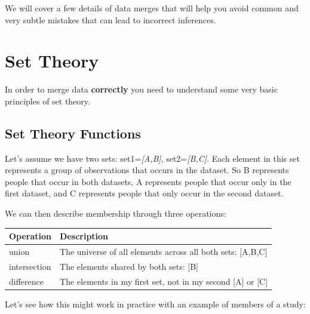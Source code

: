 \documentclass[]{book}
\newenvironment{Shaded}{\begin{snugshade}}{\end{snugshade}}
\newcommand{\KeywordTok}[1]{\textcolor[rgb]{0.13,0.29,0.53}{\textbf{#1}}}
\newcommand{\NormalTok}[1]{#1}
\newcommand{\OperatorTok}[1]{\textcolor[rgb]{0.81,0.36,0.00}{\textbf{#1}}}
\newcommand{\StringTok}[1]{\textcolor[rgb]{0.31,0.60,0.02}{#1}}
\theoremstyle{definition}
\theoremstyle{definition}
\theoremstyle{definition}
\theoremstyle{remark}
\begin{document}
We will cover a few details of data merges that will help you avoid
common and very subtle mistakes that can lead to incorrect inferences.

\hypertarget{set-theory}{%
\section{Set Theory}\label{set-theory}}

In order to merge data \textbf{correctly} you need to understand some
very basic principles of set theory.

\hypertarget{set-theory-functions}{%
\subsection{Set Theory Functions}\label{set-theory-functions}}

Let's assume we have two sets: set1=\emph{{[}A,B{]}},
set2=\emph{{[}B,C{]}}. Each element in this set represents a group of
observations that occurs in the dataset. So B represents people that
occur in both datasets, A represents people that occur only in the first
dataset, and C represents people that only occur in the second dataset.

We can then describe membership through three operations:

\begin{longtable}[]{@{}ll@{}}
\toprule
Operation & Description\tabularnewline
\midrule
\endhead
union & The universe of all elements across all both sets:
{[}A,B,C{]}\tabularnewline
intersection & The elements shared by both sets: {[}B{]}\tabularnewline
difference & The elements in my first set, not in my second {[}A{]} or
{[}C{]}\tabularnewline
\bottomrule
\end{longtable}

Let's see how this might work in practice with an example of members of
a study:

\begin{Shaded}
\end{Shaded}
\end{document}

